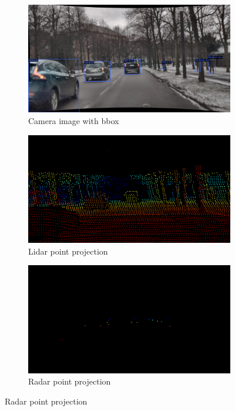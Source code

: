 \documentclass[report.tex]{subfiles}
\begin{document}
    \begin{figure}[ht]
        \centering
        \begin{subfigure}{0.3\textwidth}
            \centering
            \includegraphics[width=\linewidth]{images/methods/mtdetr/2018-02-06_15-58-05_00000.png}
            \caption{Camera image with bbox}
            \label{fig:camera_image_mtdetr}
        \end{subfigure}
        \hfill
        \begin{subfigure}{0.3\textwidth}
            \centering
            \includegraphics[width=\linewidth]{images/methods/mtdetr/2018-02-06_15-58-05_00000_lidar.png}
            \caption{Lidar point projection}
            \label{fig:lidar_cam_mtdetr}
        \end{subfigure}
        \hfill
        \begin{subfigure}{0.3\textwidth}
            \centering
            \includegraphics[width=\linewidth]{images/methods/mtdetr/2018-02-06_15-58-05_00000_radar.png}
            \caption{Radar point projection}
            \label{fig:radar_cam_mtdetr}
        \end{subfigure}
    

\end{figure}
\end{document}
